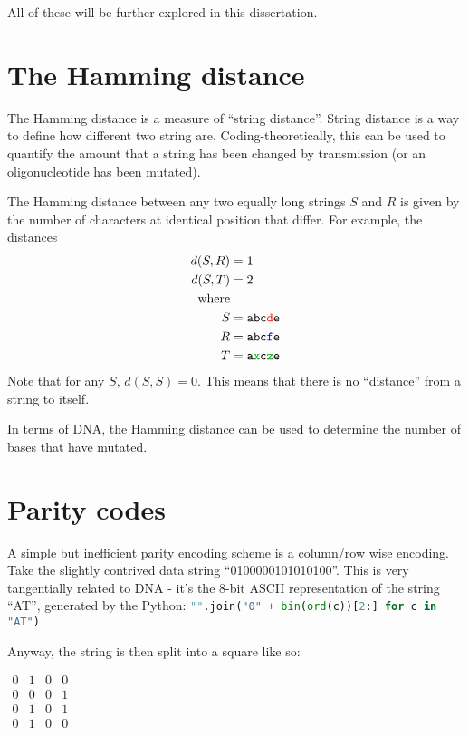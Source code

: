 \documentclass{article}
\begin{document}
    All of these will be further explored in this dissertation.

    \section{The Hamming distance}

    The Hamming distance is a measure of ``string distance''. String
    distance is a way to define how different two string are.
    Coding-theoretically, this can be used to quantify the amount that a
    string has been changed by transmission (or an oligonucleotide has been
    mutated).

    The Hamming distance between any two equally long strings $S$ and $R$
    is given by the number of characters at identical position that differ.
    For example, the distances 
    \begin{align*}
    d(S, R) &= 1\\
    d(S, T) &= 2\\
    \text{where}\\
    S &= \texttt{abc\textcolor{red}{d}e}\\
    R &= \texttt{abc\textcolor{blue}{f}e}\\
    T &= \texttt{a\textcolor{codegreen}{x}c\textcolor{codegreen}{z}e}
    \end{align*}
    Note that for any $S$, $d(S, S) = 0$. This means that there is no
    ``distance'' from a string to itself.

    In terms of DNA, the Hamming distance can be used to determine the
    number of bases that have mutated.


    \section{Parity codes}

    A simple but inefficient parity encoding scheme is a column/row wise
    encoding. Take the slightly contrived data string ``0100000101010100''.
    This is very tangentially related to DNA - it's the 8-bit ASCII
    representation of the string ``AT'', generated by the Python:
    \lstinline[language=Python]|"".join("0" + bin(ord(c))[2:] for c in "AT")|


    Anyway, the string is then split into a square like so:

    \begin{center}
    \begin{math}
    \begin{matrix}
        0 & 1 & 0 & 0 \\ 
        0 & 0 & 0 & 1 \\
        0 & 1 & 0 & 1 \\
        0 & 1 & 0 & 0
    \end{matrix}
    \end{math}
    \end{center}
\end{document}
